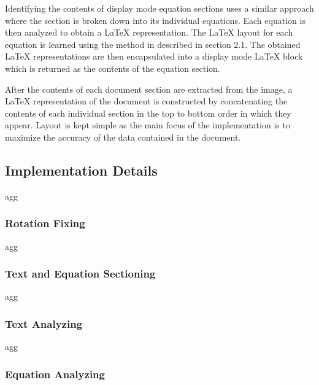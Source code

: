 \documentclass[12pt]{IEEEtran}
\newcommand{\latex}{\LaTeX\xspace}
\begin{document}
Identifying the contents of display mode equation sections uses a similar approach where the section is broken down  into its individual equations. Each equation is then analyzed to obtain a \latex representation. The \latex layout for each equation is learned using the method in \cite{4} described in section 2.1. The obtained \latex representations are then encapsulated into a display mode \latex block which is returned as the contents of the equation section.

After the contents of each document section are extracted from the image, a \latex representation of the document is constructed by concatenating the contents of each individual section in the top to bottom order in which they appear. Layout is kept simple as the main focus of the implementation is to maximize the accuracy of the data contained in the document.

\subsection{Implementation Details}

agg

\subsubsection{Rotation Fixing}

agg

\subsubsection{Text and Equation Sectioning}

agg

\subsubsection{Text Analyzing}

agg

\subsubsection{Equation Analyzing}

\end{document}
